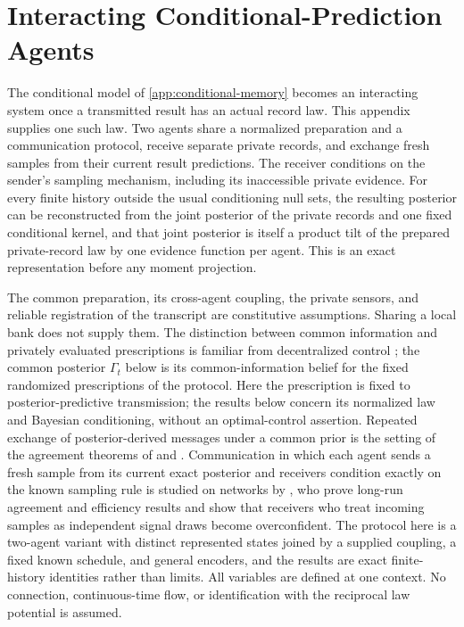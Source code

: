 \chapter{Interacting Conditional-Prediction Agents}
\label{app:interacting-memory}

The conditional model of \cref{app:conditional-memory} becomes an interacting system once a transmitted result has an actual record law. This appendix supplies one such law. Two agents share a normalized preparation and a communication protocol, receive separate private records, and exchange fresh samples from their current result predictions. The receiver conditions on the sender's sampling mechanism, including its inaccessible private evidence. For every finite history outside the usual conditioning null sets, the resulting posterior can be reconstructed from the joint posterior of the private records and one fixed conditional kernel, and that joint posterior is itself a product tilt of the prepared private-record law by one evidence function per agent. This is an exact representation before any moment projection.

The common preparation, its cross-agent coupling, the private sensors, and reliable registration of the transcript are constitutive assumptions. Sharing a local bank does not supply them. The distinction between common information and privately evaluated prescriptions is familiar from decentralized control \citep{Nayyar2013CommonInformation}; the common posterior $\Gamma_t$ below is its common-information belief for the fixed randomized prescriptions of the protocol. Here the prescription is fixed to posterior-predictive transmission; the results below concern its normalized law and Bayesian conditioning, without an optimal-control assertion. Repeated exchange of posterior-derived messages under a common prior is the setting of the agreement theorems of \citet{Aumann1976} and \citet{GeanakoplosPolemarchakis1982}. Communication in which each agent sends a fresh sample from its current exact posterior and receivers condition exactly on the known sampling rule is studied on networks by \citet{DeshpandeMosselSohn2022}, who prove long-run agreement and efficiency results and show that receivers who treat incoming samples as independent signal draws become overconfident. The protocol here is a two-agent variant with distinct represented states joined by a supplied coupling, a fixed known schedule, and general encoders, and the results are exact finite-history identities rather than limits. All variables are defined at one context. No connection, continuous-time flow, or identification with the reciprocal law potential is assumed.

